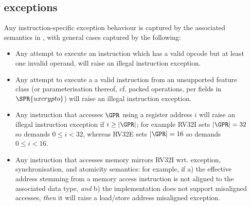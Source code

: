 \subsection{\XCRYPTO exceptions}
\label{sec:spec:exception}


Any instruction-specific exception behaviour is captured by the associated
semantics in , with general cases captured by
the following:

\begin{itemize}
\item Any attempt to execute 
      an \XCRYPTO instruction which has a valid opcode but at least one invalid operand,
      will raise an 
      illegal instruction exception.
\item Any attempt to execute a
      a valid \XCRYPTO instruction from an unsupported feature class (or parameterisation thereof, cf. packed operations, per fields in $\SPR{uxcrypto}$)
      will raise an 
      illegal instruction exception.
\item Any instruction that accesses $\GPR$ using a register address $i$ 
      will raise an
      illegal instruction exception
      if $i \geq |\GPR|$; for example
      RV32I sets $|\GPR| = 32$ so demands $0 \leq i < 32$,
      whereas
      RV32E sets $|\GPR| = 16$ so demands $0 \leq i < 16$.
\item Any instruction that accesses memory mirrors RV32I wrt. exception,
      synchronisation, and atomicity semantics: for example, if
      a) the effective address stemming from a memory access instruction
         is not aligned to the associated data type, 
         {\em  and}
      b) the implementation does not support misaligned accesses,
         {\em then} it 
      will raise a 
      load/store address misaligned exception.
\end{itemize}

